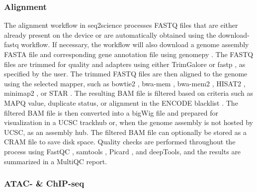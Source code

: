 \subsubsection{Alignment}

The alignment workflow in seq2science processes FASTQ files that are either already present on the device or are automatically obtained using the download-fastq workflow. If necessary, the workflow will also download a genome assembly FASTA file and corresponding gene annotation file using genomepy \cite{Frlich2023}. The FASTQ files are trimmed for quality and adapters using either TrimGalore \cite{trimgalore} or fastp \cite{Chen2018}, as specified by the user. The trimmed FASTQ files are then aligned to the genome using the selected mapper, such as bowtie2 \cite{bowtie2}, bwa-mem \cite{bwamem}, bwa-mem2 \cite{bwamem2}, HISAT2 \cite{hisat2}, minimap2 \cite{minimap2}, or STAR \cite{star}. The resulting BAM file is filtered based on criteria such as MAPQ value, duplicate status, or alignment in the ENCODE blacklist \cite{blacklist}. The filtered BAM file is then converted into a bigWig file and prepared for visualization in a UCSC trackhub \cite{trackhub} or, when the genome assembly is not hosted by UCSC, as an assembly hub. The filtered BAM file can optionally be stored as a CRAM file to save disk space. Quality checks are performed throughout the process using FastQC \cite{fastqc}, samtools \cite{samtools}, Picard \cite{picard}, and deepTools\cite{deeptools}, and the results are summarized in a MultiQC report\cite{Ewels2016}.

\subsubsection{ATAC- \& ChIP-seq}

